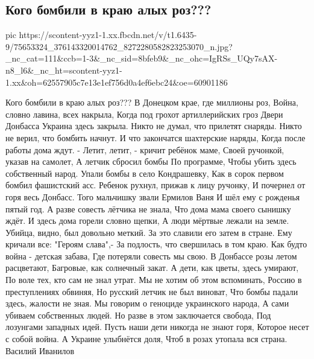  
 
 
 
 

\subsection{Кого бомбили в краю алых роз???}
\label{sec:02_07_2020.fb.2.doneck_rozy_vojna}


\ifcmt
  pic https://scontent-yyz1-1.xx.fbcdn.net/v/t1.6435-9/75653324_376143320014762_8272280582823253070_n.jpg?_nc_cat=111&ccb=1-3&_nc_sid=8bfeb9&_nc_ohc=IgRSs_UQy7sAX-n8_l6&_nc_ht=scontent-yyz1-1.xx&oh=62557905c7e13e1ef756d0a4ef6ebc24&oe=60901186
\fi

Кого бомбили в краю алых роз???
В Донецком крае, где миллионы роз,
Война, словно лавина, всех накрыла,
Когда под грохот артиллерийских гроз
Двери Донбасса Украина здесь закрыла.
Никто не думал, что прилетят снаряды.
Никто не верил, что бомбить начнут.
И что закончатся шахтерские наряды,
Когда после работы дома ждут.
- Летит, летит, - кричит ребёнок маме,
Своей ручонкой, указав на
самолет,
А летчик сбросил бомбы
По программе,
Чтобы убить здесь собственный народ.
Упали бомбы в село Кондрашевку, 
Как в сорок первом бомбил фашистский асс.
Ребенок рухнул, прижав к лицу ручонку,
И почернел от горя весь Донбасс.
Того мальчишку звали Ермилов Ваня
И шёл ему с рожденья пятый год.
А разве совесть лётчика не знала,
Что дома мама своего сынишку ждёт.
И здесь дома горели словно щепки,
А люди мёртвые лежали на земле.
Убийца, видно, был довольно меткий.
За это славили его затем в стране.
Ему кричали все: "Героям слава",-
За подлость, что свершилась в том краю.
Как будто война - детская забава,
Где потеряли совесть мы свою.
В Донбассе розы летом
расцветают,
Багровые, как солнечный закат.
А дети, как цветы, здесь умирают,
По воле тех, кто сам не знал утрат.
Мы не хотим об этом вспоминать, 
Россию в преступлениях обвиняя,
Но русский летчик не был виноват,
Что бомбы падали здесь, жалости не зная.
Мы говорим о геноциде украинского народа,
А сами убиваем собственных людей.
Но разве в этом заключается свобода,
Под лозунгами западных идей.
Пусть наши дети никогда не знают горя,
Которое несет с собой  война.
А Украине улыбнётся доля,
Чтоб в розах утопала вся страна.
Василий Иванилов

